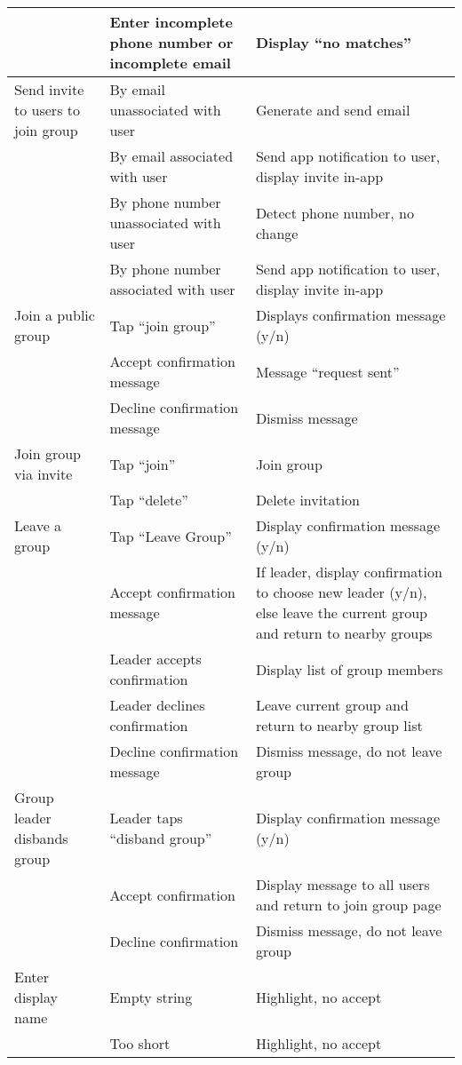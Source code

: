 \begin{tabularx}{\linewidth}{|X|X|X|}
                 & Enter incomplete phone number or incomplete email & Display ``no matches'' \\
\hline
Send invite to users to join group & By email unassociated with user & Generate and send email \\
                                   & By email associated with user & Send app notification to user, display invite in-app \\
                                   & By phone number unassociated with user & Detect phone number, no change \\
                                   & By phone number associated with user & Send app notification to user, display invite in-app \\
\hline
Join a public group & Tap ``join group'' & Displays confirmation message (y/n) \\
                    & Accept confirmation message & Message ``request sent'' \\
                    & Decline confirmation message & Dismiss message \\
\hline
Join group via invite & Tap ``join'' & Join group \\
                      & Tap ``delete'' & Delete invitation \\
\hline
Leave a group & Tap ``Leave Group'' & Display confirmation message (y/n) \\
              & Accept confirmation message & If leader, display confirmation to choose new leader (y/n), else leave the current group and return to nearby groups \\
              & Leader accepts confirmation & Display list of group members \\
              & Leader declines confirmation & Leave current group and return to nearby group list \\
              & Decline confirmation message & Dismiss message, do not leave group \\
\hline
Group leader disbands group & Leader taps ``disband group'' & Display confirmation message (y/n) \\
                            & Accept confirmation & Display message to all users and return to join group page \\
                            & Decline confirmation & Dismiss message, do not leave group \\
\hline
Enter display name & Empty string & Highlight, no accept \\
                   & Too short & Highlight, no accept \\

\end{tabularx}
